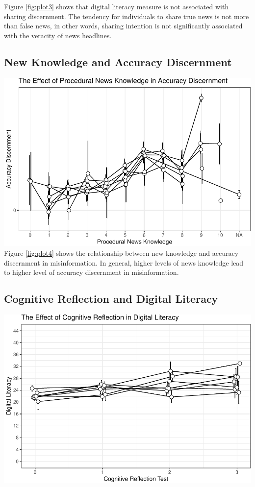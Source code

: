 \documentclass[
]{article}
\begin{document}
Figure \label{fig:plot3} \ref{fig:plot3} shows that digital literacy measure is not associated with sharing discernment. The tendency for individuals to share true news is not more than false news, in other words, sharing intention is not significantly associated with the veracity of news headlines.

\hypertarget{new-knowledge-and-accuracy-discernment}{%
\subsection{New Knowledge and Accuracy Discernment}\label{new-knowledge-and-accuracy-discernment}}

\includegraphics{Replication2019_files/figure-latex/plot4-1.pdf}
Figure \label{fig:plot4} \ref{fig:plot4} shows the relationship between new knowledge and accuracy discernment in misinformation. In general, higher levels of news knowledge lead to higher level of accuracy discernment in misinformation.

\hypertarget{cognitive-reflection-and-digital-literacy}{%
\subsection{Cognitive Reflection and Digital Literacy}\label{cognitive-reflection-and-digital-literacy}}

\includegraphics{Replication2019_files/figure-latex/plot5-1.pdf}
\end{document}
